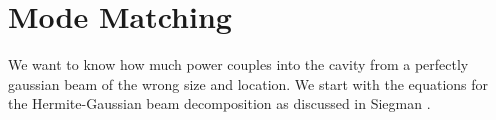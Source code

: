 %
%
%
%
%

\section{Mode Matching}
We want to know how much power couples into the cavity from a
perfectly gaussian beam of the wrong size and location. We start with
the equations for the Hermite-Gaussian beam decomposition as discussed in
Siegman \cite{Siegman86}. 


